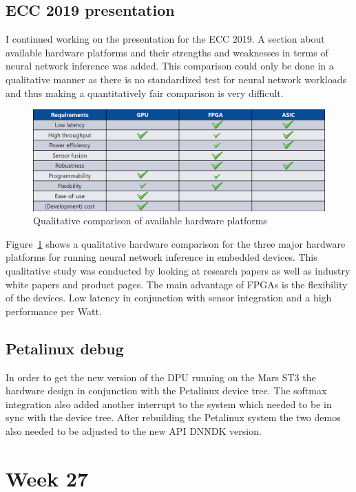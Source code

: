 \subsection{ECC 2019 presentation}
I continued working on the presentation for the ECC 2019. A section about available hardware platforms and their strengths and weaknesses in terms of neural network inference was added. This comparison could only be done in a qualitative manner as there is no standardized test for neural network workloads and thus making a quantitatively fair comparison is very difficult.
\begin{figure}[!htb]
	\centering
		\includegraphics[width=\textwidth]{bilder/hardware_comp.png}
		\caption{Qualitative comparison of available hardware platforms}
		\label{fig:hardware_comp}
\end{figure}
Figure~\ref{fig:hardware_comp} shows a qualitative hardware comparison for the three major hardware platforms for running neural network inference in embedded devices. This qualitative study was conducted by looking at research papers as well as industry white papers and product pages. The main advantage of \acp{FPGA} is the flexibility of the devices. Low latency in conjunction with sensor integration and a high performance per Watt. 
\subsection{Petalinux debug}
In order to get the new version of the \ac{DPU} running on the Mars ST3 the hardware design in conjunction with the Petalinux device tree. The softmax integration also added another interrupt to the system which needed to be in sync with the device tree. After rebuilding the Petalinux system the two demos also needed to be adjusted to the new \ac{API} \ac{DNNDK} version.

\section{Week 27}
